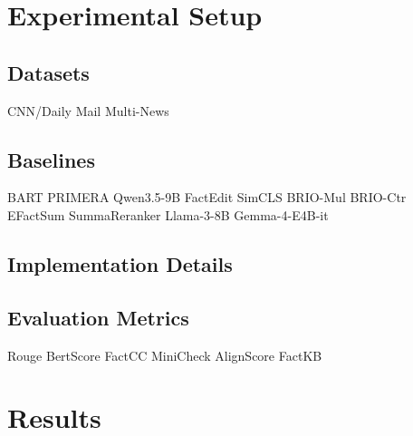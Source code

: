 \documentclass[11pt]{article}
\begin{document}
\section{Experimental Setup}
\subsection{Datasets}
CNN/Daily Mail\cite{nallapati-etal-2016-abstractive}
Multi-News\cite{fabbri-etal-2019-multi}
\subsection{Baselines}
BART\cite{lewis-etal-2020-bart}
PRIMERA\cite{xiao-etal-2022-primera}
Qwen3.5-9B\cite{qwenteam2026qwen35omnitechnicalreport}
FactEdit\cite{balachandran-etal-2022-correcting}
SimCLS\cite{liu-liu-2021-simcls}
BRIO-Mul\cite{liu-etal-2022-brio}
BRIO-Ctr\cite{liu-etal-2022-brio}
EFactSum\cite{dixit-etal-2023-improving}
SummaReranker\cite{ravaut-etal-2022-summareranker}
Llama-3-8B\cite{llama3modelcard}
Gemma-4-E4B-it\cite{gemma2024, gemma4_e4b_it}

\subsection{Implementation Details}

\subsection{Evaluation Metrics}
Rouge
BertScore
FactCC
MiniCheck
AlignScore
FactKB
\section{Results}
\end{document}
